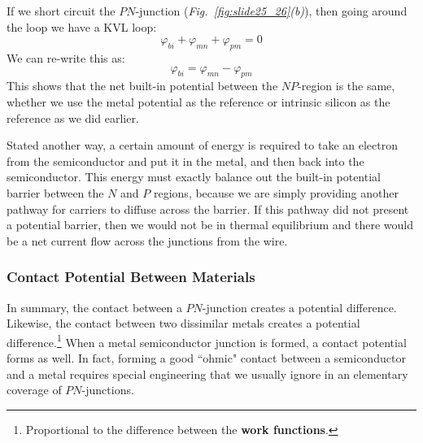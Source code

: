 If we short circuit the $PN$-junction \big(\emph{Fig.~\ref{fig:slide25_26}(b)}\big), then going around the loop we have a KVL loop:
    \begin{equation}
        \varphi_{bi} + \varphi_{mn} + \varphi_{pm} = 0
    \end{equation}
We can re-write this as:
    \begin{equation}
        \varphi_{bi} =  \varphi_{mn} - \varphi_{pm} 
    \end{equation}
This shows that the net built-in potential between the $NP$-region is the same, whether we use the metal potential as the reference or intrinsic silicon as the reference as we did earlier.  

Stated another way, a certain amount of energy is required to take an electron from the semiconductor and put it in the metal, and then back into the semiconductor.  This energy must exactly balance out the built-in potential barrier between the $N$ and $P$ regions, because we are simply providing another pathway for carriers to diffuse across the barrier.  If this pathway did not present a potential barrier,  then we would not be in thermal equilibrium and there would be a net current flow across the junctions from the wire.
\subsubsection{Contact Potential Between Materials}
In summary, the contact between a $PN$-junction creates a potential difference.    Likewise, the contact between two dissimilar metals creates a potential difference.\footnote{Proportional to the difference between the \textbf{work functions}.}   When a metal semiconductor junction is formed, a contact potential forms as well.  In fact, forming a good ``ohmic" contact between a semiconductor and a metal requires special engineering that we usually ignore in an elementary coverage of $PN$-junctions.   
